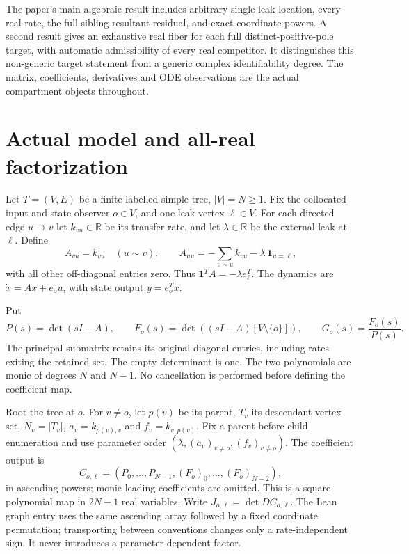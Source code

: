\documentclass[11pt]{article}
\theoremstyle{remark}
\newcommand{\R}{\mathbb R}
\newcommand{\1}{\mathbf 1}
\begin{document}
The paper's main algebraic result includes arbitrary single-leak location,
every real rate, the full sibling-resultant residual, and exact coordinate
powers. A second result gives an exhaustive real fiber for each full
distinct-positive-pole target, with automatic admissibility of every real
competitor. It distinguishes this non-generic target statement from a generic
complex identifiability degree. The matrix, coefficients, derivatives and
ODE observations are the actual compartment objects throughout.

\section{Actual model and all-real factorization}
Let $T=(V,E)$ be a finite labelled simple tree, $|V|=N\ge1$. Fix the
collocated input and state observer $o\in V$, and one leak vertex $\ell\in V$.
For each directed edge $u\to v$ let $k_{v u}\in\R$ be its transfer rate,
and let $\lambda\in\R$ be the external leak at $\ell$. Define
\begin{equation}\label{eq:model}
 A_{v u}=k_{v u}\quad(u\sim v),\qquad
 A_{u u}=-\sum_{v\sim u}k_{v u}-\lambda\,\1_{u=\ell},
\end{equation}
with all other off-diagonal entries zero. Thus
$\1^T A=-\lambda e_\ell^T$. The dynamics are
$\dot x=Ax+e_o u$, with state output $y=e_o^Tx$.

Put
\begin{equation}\label{eq:pair}
 P(s)=\det(sI-A),\qquad
 F_o(s)=\det((sI-A)[V\setminus\{o\}]),\qquad
 G_o(s)=\frac{F_o(s)}{P(s)}.
\end{equation}
The principal submatrix retains its original diagonal entries, including
rates exiting the retained set. The empty determinant is one. The two
polynomials are monic of degrees $N$ and $N-1$. No cancellation is performed
before defining the coefficient map.

Root the tree at $o$. For $v\ne o$, let $p(v)$ be its parent,
$T_v$ its descendant vertex set, $N_v=|T_v|$,
$a_v=k_{p(v),v}$ and $f_v=k_{v,p(v)}$. Fix a parent-before-child enumeration
and use parameter order $(\lambda,(a_v)_{v\ne o},(f_v)_{v\ne o})$.
The coefficient output is
\[
 C_{o,\ell}=(P_0,\ldots,P_{N-1},(F_o)_0,\ldots,(F_o)_{N-2}),
\]
in ascending powers; monic leading coefficients are omitted. This is a square
polynomial map in $2N-1$ real variables. Write
$J_{o,\ell}=\det DC_{o,\ell}$.
The Lean graph entry uses the same ascending array followed by a fixed
coordinate permutation; transporting between conventions changes only a
rate-independent sign. It never introduces a parameter-dependent factor.
\end{document}
